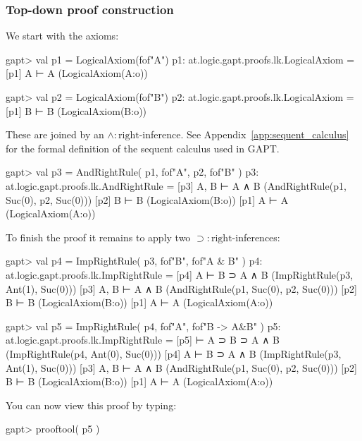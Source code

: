 \documentclass[a4paper,11pt]{article}
\newcommand{\impl}{\supset} %
\renewcommand{\land}{\wedge}
\begin{document}
\subsubsection{Top-down proof construction}
We start with the axioms:
%
\begin{clilisting}
gapt> val p1 = LogicalAxiom(fof"A")
p1: at.logic.gapt.proofs.lk.LogicalAxiom =
[p1] A ⊢ A    (LogicalAxiom(A:o))

gapt> val p2 = LogicalAxiom(fof"B")
p2: at.logic.gapt.proofs.lk.LogicalAxiom =
[p1] B ⊢ B    (LogicalAxiom(B:o))

\end{clilisting}
%
These are joined by an $\land:\mathrm{right}$-inference. See Appendix~\ref{app:sequent_calculus}
for the formal definition of the sequent calculus used in GAPT.
\begin{clilisting}
gapt> val p3 = AndRightRule( p1, fof"A", p2, fof"B" )
p3: at.logic.gapt.proofs.lk.AndRightRule =
[p3] A, B ⊢ A ∧ B    (AndRightRule(p1, Suc(0), p2, Suc(0)))
[p2] B ⊢ B    (LogicalAxiom(B:o))
[p1] A ⊢ A    (LogicalAxiom(A:o))

\end{clilisting}
%
To finish the proof it remains to apply two $\impl:\mathrm{right}$-inferences:
%
\begin{clilisting}
gapt> val p4 = ImpRightRule( p3, fof"B", fof"A & B" )
p4: at.logic.gapt.proofs.lk.ImpRightRule =
[p4] A ⊢ B ⊃ A ∧ B    (ImpRightRule(p3, Ant(1), Suc(0)))
[p3] A, B ⊢ A ∧ B    (AndRightRule(p1, Suc(0), p2, Suc(0)))
[p2] B ⊢ B    (LogicalAxiom(B:o))
[p1] A ⊢ A    (LogicalAxiom(A:o))

gapt> val p5 = ImpRightRule( p4, fof"A", fof"B -> A&B" )
p5: at.logic.gapt.proofs.lk.ImpRightRule =
[p5]  ⊢ A ⊃ B ⊃ A ∧ B    (ImpRightRule(p4, Ant(0), Suc(0)))
[p4] A ⊢ B ⊃ A ∧ B    (ImpRightRule(p3, Ant(1), Suc(0)))
[p3] A, B ⊢ A ∧ B    (AndRightRule(p1, Suc(0), p2, Suc(0)))
[p2] B ⊢ B    (LogicalAxiom(B:o))
[p1] A ⊢ A    (LogicalAxiom(A:o))

\end{clilisting}
%
You can now view this proof by typing:
\begin{clilisting}
gapt> prooftool( p5 )

\end{clilisting}
\end{document}
